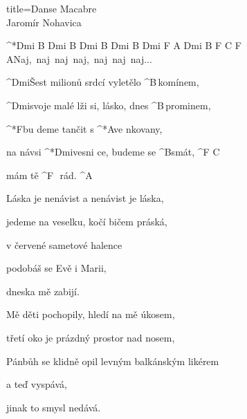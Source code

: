 \begin{song}{title=\predtitle\centering Danse Macabre \\\large Jaromír Nohavica \vspace*{-0.3cm}}  %
\nejnejvetsi

^*{Dmi B Dmi B Dmi B Dmi B Dmi F A Dmi B F C F A\z}Naj,~naj~naj~naj,~naj~naj~naj\elipsa.\elipsa.\elipsa.\phantom{aaaaaaaaaaaaaaaaaaaaaaaaaaaaaaaaaa}

\begin{centerjustified}
\sloka
	^{Dmi}Šest milionů srdcí vyletělo ^{\z B\,}komínem,

	^{Dmi}svoje malé lži si, lásko, dnes ^{\z B\,}prominem,

	^*{F}bu deme tančit s ^*{A}ve nkovany,

	na návsi ^*{Dmi}vesni ce, budeme se ^{B\z }smát, ^{F\,\,C}

	mám tě ^{F\,\,\,\,}rád. ^{A}


\sloka
	Láska je nenávist a nenávist je láska,

	jedeme na veselku, kočí bičem práská,

	v červené sametové halence

	podobáš se Evě i Marii,

	dneska mě zabijí.


\sloka
	Mě děti pochopily, hledí na mě úkosem,

	třetí oko je prázdný prostor nad nosem,

	Pánbůh se klidně opil levným balkánským likérem

	a teď vyspává,

	jinak to smysl nedává.

\end{centerjustified}
\setcounter{Slokočet}{0}
\end{song}
